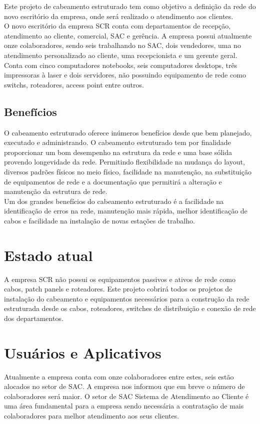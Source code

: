 \documentclass[	DIV=calc,%
							paper=a4,%
							fontsize=12pt,%
							onecolumn]{scrartcl}	 					%
\begin{document}
Este projeto de cabeamento estruturado tem como objetivo a definição da rede do novo escritório da empresa, onde será realizado o atendimento aos clientes.
\\

O novo escritório da empresa SCR conta com departamentos de recepção, atendimento ao cliente, comercial, SAC e gerência. A empresa possui atualmente onze colaboradores, sendo seis trabalhando no SAC, dois vendedores, uma no atendimento personalizado ao cliente, uma recepcionista e um gerente geral. Conta com cinco computadores notebooks, seis computadores desktops,  três  impressoras à laser e dois servidores, não possuindo equipamento de rede como switchs, roteadores, access point entre outros.  

\subsection{Benefícios}
O cabeamento estruturado oferece inúmeros benefícios desde que bem planejado, executado e administrando. O cabeamento estruturado tem por finalidade proporcionar um bom desempenho na estrutura da rede e uma base sólida provendo longevidade da rede. Permitindo flexibilidade na mudança do layout, diversos padrões físicos no meio físico, facilidade na manutenção, na substituição de equipamentos de rede e a documentação que permitirá a alteração e manutenção da estrutura de rede.
\\

Um dos grandes benefícios do cabeamento estruturado é a facilidade na identificação de erros na rede, manutenção mais rápida, melhor identificação de cabos e facilidade na instalação de novas estações de trabalho.

\section{Estado atual}
A empresa SCR não possui os equipamentos passivos e ativos de rede como cabos, patch panels e roteadores. Este projeto cobrirá todos os projetos de instalação do cabeamento e equipamentos necessários para a construção da rede estruturada desde os cabos, roteadores, switches de distribuição e conexão de rede dos departamentos.

\section{Usuários e Aplicativos}
Atualmente a empresa conta com onze colaboradores entre estes, seis estão alocados no setor de SAC. A empresa nos informou que em breve o número de colaboradores será maior. O setor de SAC Sistema de Atendimento ao Cliente é uma área fundamental para a empresa sendo necessária a contratação de mais colaboradores para melhor atendimento aos seus clientes.
\\
\end{document}
